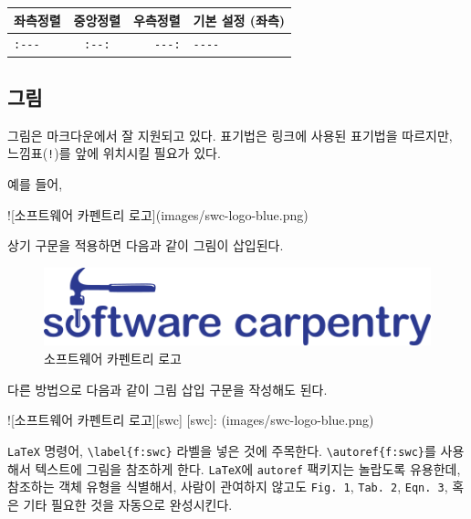 \documentclass[
  letterpaper,
]{book}
\newenvironment{Shaded}{\begin{snugshade}}{\end{snugshade}}
\newcommand{\AttributeTok}[1]{\textcolor[rgb]{0.40,0.45,0.13}{#1}}
\newcommand{\KeywordTok}[1]{\textcolor[rgb]{0.00,0.23,0.31}{#1}}
\begin{document}
\begin{longtable}[]{@{}lcrl@{}}
\toprule\noalign{}
좌측정렬 & 중앙정렬 & 우측정렬 & 기본 설정 (좌측) \\
\midrule\noalign{}
\endhead
\bottomrule\noalign{}
\endlastfoot
\texttt{:-\/-\/-} & \texttt{:-\/-:} & \texttt{-\/-\/-:} &
\texttt{-\/-\/-\/-} \\
\end{longtable}

\hypertarget{uxadf8uxb9bc-1}{%
\subsection{그림}\label{uxadf8uxb9bc-1}}

그림은 마크다운에서 잘 지원되고 있다. 표기법은 링크에 사용된 표기법을
따르지만, 느낌표(\texttt{!})를 앞에 위치시킬 필요가 있다.

예를 들어,

\begin{Shaded}
\begin{Highlighting}[]
\AttributeTok{![소프트웨어 카펜트리 로고](images/swc{-}logo{-}blue.png)}
\end{Highlighting}
\end{Shaded}

상기 구문을 적용하면 다음과 같이 그림이 삽입된다.

\begin{figure}

{\centering \includegraphics{images/swc-logo-blue.png}

}

\caption{소프트웨어 카펜트리 로고}

\end{figure}

다른 방법으로 다음과 같이 그림 삽입 구문을 작성해도 된다.

\begin{Shaded}
\begin{Highlighting}[]
\AttributeTok{![소프트웨어 카펜트리 로고][swc]}
\KeywordTok{[}\AttributeTok{swc}\KeywordTok{]:}\AttributeTok{ (images/swc{-}logo{-}blue.png)}
\end{Highlighting}
\end{Shaded}

\texttt{LaTeX} 명령어, \texttt{\textbackslash{}label\{f:swc\}} 라벨을
넣은 것에 주목한다. \texttt{\textbackslash{}autoref\{f:swc\}}를 사용해서
텍스트에 그림을 참조하게 한다. \texttt{LaTeX}에 \texttt{autoref}
팩키지는 놀랍도록 유용한데, 참조하는 객체 유형을 식별해서, 사람이
관여하지 않고도 \texttt{Fig.\ 1}, \texttt{Tab.\ 2}, \texttt{Eqn.\ 3},
혹은 기타 필요한 것을 자동으로 완성시킨다.
\end{document}
